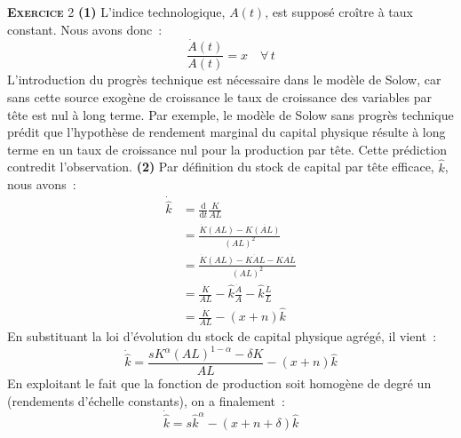 \documentclass[10pt,a4paper,notitlepage]{report}
\newcommand{\exercice}[1]{\textsc{\textbf{Exercice}} #1}
\newcommand{\question}[1]{\textbf{(#1)}}
\begin{document}
\exercice{2} \question{1} L'indice  technologique, $A(t)$, est supposé
croître à taux constant. Nous avons donc :
\[
\frac{\dot A(t)}{A(t)} = x \quad \forall\, t
\]
L'introduction du progrès  technique est nécessaire dans  le modèle de
Solow,  car  sans  cette  source  exogène de  croissance  le  taux  de
croissance des variables  par tête est nul à long  terme. Par exemple,
le modèle  de Solow sans  progrès technique prédit que  l'hypothèse de
rendement marginal du capital physique résulte à long terme en un taux
de  croissance nul  pour  la production  par  tête.  Cette  prédiction
contredit  l'observation.  \question{2}  Par définition  du  stock  de
capital par tête efficace, $\hat k$, nous avons :
\[
\begin{split}
  \dot{\hat{k}} &= \frac{\mathrm d}{\mathrm d t}\frac{K}{AL}\\
&= \frac{\dot K (AL) - K \dot{(AL)}}{(AL)^2}\\
&= \frac{\dot K (AL) - K \dot A L - K A \dot L}{(AL)^2}\\
&= \frac{\dot K}{AL} - \hat k \frac{\dot A}{A} - \hat k \frac{\dot L}{L}\\
&= \frac{\dot K}{AL} - (x+n)\hat k
\end{split}
\]
En substituant la loi d'évolution du stock de capital physique agrégé,
il vient :
\[
\dot{\hat{k}} = \frac{s K^{\alpha}(AL)^{1-\alpha}-\delta K}{AL} - (x+n)\hat k 
\]
En exploitant le  fait que la fonction de production  soit homogène de
degré un (rendements d'échelle constants), on a finalement :
\[
\dot{\hat{k}} = s \hat k^{\alpha} - (x+n+\delta)\hat k 
\]
\end{document}
